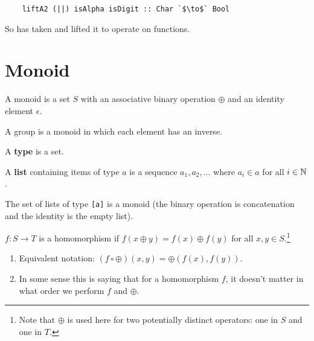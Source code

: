 \documentclass[12pt]{article}
\begin{document}
\begin{example*}
\begin{enumerate}
    \begin{verbatim}
    liftA2 (||) isAlpha isDigit :: Char `$\to$` Bool
    \end{verbatim}

    So  has taken \mih{||} and lifted it to operate on  functions.

  \end{enumerate}
\end{example*}


\section{Monoid}
\newcommand{\map}{\text{{\tt map}}}
\newcommand{\foldr}{\text{{\tt foldr}}}
\newcommand{\op}{\oplus}
\newcommand{\id}{\epsilon}

\begin{definition*}
  A monoid is a set $S$ with an associative binary operation $\op$ and an identity element $\id$.
\end{definition*}

\begin{remark*}
  A group is a monoid in which each element has an inverse.
\end{remark*}

\begin{definition*}
  A {\bf type} is a set.
\end{definition*}

\begin{definition*}
  A {\bf list} containing items of type $a$ is a sequence $a_1, a_2, \ldots$ where $a_i \in a$ for
  all $i \in \mathbb{N}$.
\end{definition*}

\begin{example*}\hspace{0pt}
  The set of lists of type \texttt{[a]} is a monoid (the binary operation is
  concatenation and the identity is the empty list).
\end{example*}

\begin{definition*}
  $f:S \to T$ is a homomorphism if $f(x \op y) = f(x) \op f(y)$ for all $x, y \in S$.\footnote{Note that $\op$ is used here for two potentially distinct operators: one in $S$ and one
    in $T$.}
\end{definition*}

\begin{remark*}\hspace{0pt}
  \begin{enumerate}
  \item Equivalent notation: $(f \circ \op)(x, y) = \op(f(x), f(y))$.
  \item In some sense this is saying that for a homomorphism $f$, it doesn't matter in what order
    we perform $f$ and $\op$.
  \end{enumerate}

\end{remark*}
\end{document}
